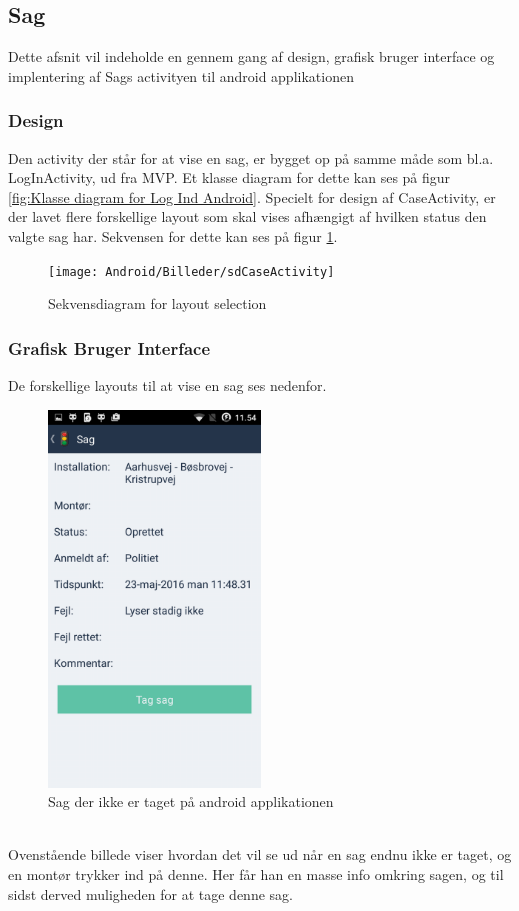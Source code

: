\subsection{Sag}
	Dette afsnit vil indeholde en gennem gang af design, grafisk bruger interface og implentering af Sags activityen til android applikationen
	
	\subsubsection{Design}
	Den activity der står for at vise en sag, er bygget op på samme måde som bl.a. LogInActivity, ud fra MVP. Et klasse diagram for dette kan ses på figur \vref{fig:Klasse diagram for Log Ind Android}.
	Specielt for design af CaseActivity, er der lavet flere forskellige layout som skal vises afhængigt af hvilken status den valgte sag har. Sekvensen for dette kan ses på figur \ref{fig:Sekvensdiagram CaseActivity}.
	
	\begin{figure} [!ht]
		\begin{center}
			\texttt{[image: Android/Billeder/sdCaseActivity]}
		\end{center}
		\caption{Sekvensdiagram for layout selection}
		\label{fig:Sekvensdiagram CaseActivity}
	\end{figure}
	
	\pagebreak
	
	\subsubsection{Grafisk Bruger Interface}
	De forskellige layouts til at vise en sag ses nedenfor.	
	\begin{figure} [!ht]
		\begin{center}
			\includegraphics[height=10cm]{Android/Billeder/AndroidSagRod}
		\end{center}
		\caption{Sag der ikke er taget på android applikationen}
		\label{fig:Sag der ikke er taget på android applikationen}
	\end{figure} \\
	Ovenstående billede viser hvordan det vil se ud når en sag endnu ikke er taget, og en montør trykker ind på denne. Her får han en masse info omkring sagen, og til sidst derved muligheden for at tage denne sag.
	\newpage
	
